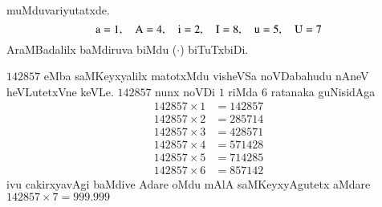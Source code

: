 muMduvariyutatxde.
$$
{\text a} = 1, \quad {\text A} = 4, \quad {\text i} = 2, \quad {\text I} = 8, \quad {\text u} = 5, \quad {\text U} = 7
$$
AraMBadalilx baMdiruva biMdu ($\cdot$) biTuTxbiDi.

$142857$ eMba saMKeyxyalilx matotxMdu visheVSa noVDabahudu nAneV heVLutetxVne keVLe. $142857$ nunx noVDi $1$ riMda $6$ ratanaka guNisidAga 
\begin{align*}
  142857 \times 1 & = 142857\\
  142857 \times 2 & = 285714\\
  142857 \times 3 & = 428571\\
  142857 \times 4 & =571428\\
  142857 \times 5 & =714285\\
  142857 \times 6 & =857142
\end{align*}
ivu cakirxyavAgi baMdive Adare oMdu mAlA saMKeyxyAgutetx aMdare $142857 \times 7 = 999.999$

